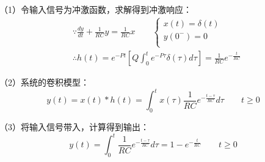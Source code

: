 （1）令输入信号为冲激函数，求解得到冲激响应：
\begin{align*}
&\because \frac{dy}{dt}+\frac{1}{RC}y=\frac{1}{RC}x \qquad \begin{cases}
	x\left( t \right) =\delta \left( t \right)\\
	y\left( 0^- \right) =0\\
\end{cases} \\
&\therefore h\left( t \right) =e^{-Pt}\left[ Q\int_0^t{e^{-P\tau}\delta \left( \tau \right) d\tau} \right] =\frac{1}{RC}e^{-\frac{t}{RC}}
\end{align*}

（2）系统的卷积模型：
\[
y\left( t \right) =x\left( t \right) \ast h\left( t \right) =\int_0^t{x\left( \tau \right) \frac{1}{RC}e^{-\frac{t-\tau}{RC}}d\tau} \qquad t\geqslant 0
\]

（3）将输入信号带入，计算得到输出：
\[
y\left( t \right) =\int_0^t{\frac{1}{RC}e^{-\frac{t-\tau}{RC}}d\tau}=1-e^{-\frac{t}{RC}} \qquad t\geqslant 0
\]




